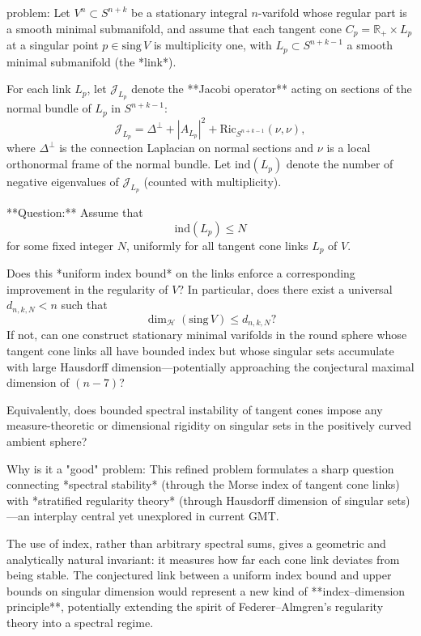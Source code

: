problem:  
Let \(V^n \subset S^{n+k}\) be a stationary integral \(n\)-varifold whose regular part is a smooth minimal submanifold, and assume that each tangent cone \(C_p = \mathbb{R}_+ \times L_p\) at a singular point \(p \in \mathrm{sing}\,V\) is multiplicity one, with \(L_p \subset S^{n+k-1}\) a smooth minimal submanifold (the *link*).  

For each link \(L_p\), let \(\mathcal{J}_{L_p}\) denote the **Jacobi operator** acting on sections of the normal bundle of \(L_p\) in \(S^{n+k-1}\):
\[
\mathcal{J}_{L_p} = \Delta^{\perp} + |A_{L_p}|^2 + \mathrm{Ric}_{S^{n+k-1}}(\nu,\nu),
\]
where \(\Delta^{\perp}\) is the connection Laplacian on normal sections and \(\nu\) is a local orthonormal frame of the normal bundle.  
Let \(\mathrm{ind}(L_p)\) denote the number of negative eigenvalues of \(\mathcal{J}_{L_p}\) (counted with multiplicity).

**Question:**  
Assume that 
\[
\mathrm{ind}(L_p) \le N
\]
for some fixed integer \(N\), uniformly for all tangent cone links \(L_p\) of \(V\).  

Does this *uniform index bound* on the links enforce a corresponding improvement in the regularity of \(V\)?  
In particular, does there exist a universal \(d_{n,k,N} < n\) such that
\[
\dim_{\mathcal{H}}(\mathrm{sing}\,V) \le d_{n,k,N}?
\]
If not, can one construct stationary minimal varifolds in the round sphere whose tangent cone links all have bounded index but whose singular sets accumulate with large Hausdorff dimension—potentially approaching the conjectural maximal dimension of \((n-7)\)?  

Equivalently, does bounded spectral instability of tangent cones impose any measure-theoretic or dimensional rigidity on singular sets in the positively curved ambient sphere?

Why is it a "good" problem:  
This refined problem formulates a sharp question connecting *spectral stability* (through the Morse index of tangent cone links) with *stratified regularity theory* (through Hausdorff dimension of singular sets)—an interplay central yet unexplored in current GMT.  

The use of index, rather than arbitrary spectral sums, gives a geometric and analytically natural invariant: it measures how far each cone link deviates from being stable. The conjectured link between a uniform index bound and upper bounds on singular dimension would represent a new kind of **index–dimension principle**, potentially extending the spirit of Federer–Almgren’s regularity theory into a spectral regime.  

